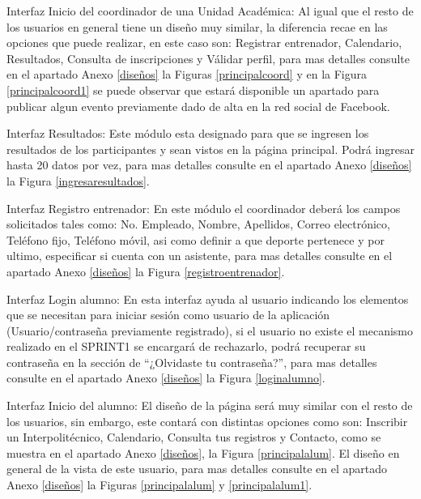 	\noindent Interfaz  Inicio del coordinador de una Unidad Académica: Al igual que el resto de los usuarios en general tiene un diseño muy similar, la diferencia recae en las opciones que puede realizar, en este caso son: Registrar entrenador, Calendario, Resultados, Consulta de inscripciones y Válidar perfil, para mas detalles consulte en el apartado Anexo \ref{diseños} la Figuras 	\ref{principalcoord} y en la Figura \ref{principalcoord1} se puede observar que estará disponible un apartado para publicar algun evento previamente dado de alta en la red social de Facebook.
	\newline
	
	\noindent Interfaz Resultados: Este módulo esta designado para que se ingresen los resultados de los participantes y sean vistos en la página principal. Podrá ingresar hasta 20 datos por vez, para mas detalles consulte en el apartado Anexo \ref{diseños} la Figura \ref{ingresaresultados}.
	\newline
	
	\noindent Interfaz Registro entrenador: En este  módulo el coordinador deberá los campos solicitados tales como: No. Empleado, Nombre, Apellidos, Correo electrónico, Teléfono fijo, Teléfono móvil, asi como definir a que deporte pertenece y por ultimo, especificar si cuenta con un asistente, para mas detalles consulte en el apartado Anexo \ref{diseños} la Figura \ref{registroentrenador}.
	\newline
	
	\noindent Interfaz Login alumno: En esta interfaz ayuda al usuario indicando los elementos que se necesitan para iniciar sesión como usuario de la aplicación (Usuario/contraseña previamente registrado), si el usuario no existe el mecanismo realizado en el SPRINT1 se encargará de rechazarlo, podrá recuperar su contraseña en la sección de “¿Olvidaste tu contraseña?”, para mas detalles consulte en el apartado Anexo \ref{diseños} la Figura \ref{loginalumno}.
	\newline
	
	\noindent Interfaz Inicio del alumno: El diseño de la página será muy similar con el resto de los usuarios, sin embargo, este contará con distintas opciones como son: Inscribir un Interpolitécnico, Calendario, Consulta tus registros y Contacto, como se muestra en el apartado Anexo \ref{diseños}, la Figura 	\ref{principalalum}. El diseño en general de la vista de este usuario, para mas detalles consulte en el apartado Anexo \ref{diseños} la Figuras \ref{principalalum} y \ref{principalalum1}.
	\newline
	

